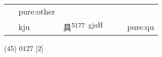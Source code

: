 \documentclass[14pt,a4paper]{scrartcl}
\begin{document}
\begin{longtable}[c]{@{}llllll@{}}
\begin{minipage}[t]{0.14\columnwidth}\raggedright\strut
\strut\end{minipage} &
\begin{minipage}[t]{0.14\columnwidth}\raggedright\strut
pure:other
\strut\end{minipage}\tabularnewline
\begin{minipage}[t]{0.14\columnwidth}\raggedright\strut
𥃲
\strut\end{minipage} &
\begin{minipage}[t]{0.14\columnwidth}\raggedright\strut
kju
\strut\end{minipage} &
\begin{minipage}[t]{0.14\columnwidth}\raggedright\strut
具\textsuperscript{5177~gjuH}
\strut\end{minipage} &
\begin{minipage}[t]{0.14\columnwidth}\raggedright\strut
\strut\end{minipage} &
\begin{minipage}[t]{0.14\columnwidth}\raggedright\strut
\strut\end{minipage} &
\begin{minipage}[t]{0.14\columnwidth}\raggedright\strut
pure:qu
\strut\end{minipage}\tabularnewline
\bottomrule
\end{longtable}

(45) 0127 {[}2{]}
\end{document}
